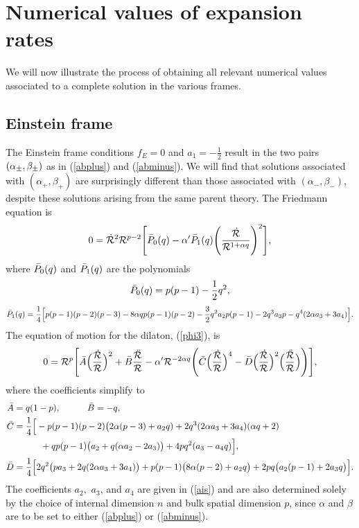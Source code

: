 \documentclass[amsmath,amssymb,11pt]{article}
\begin{document}



\section{Numerical values of expansion rates}\label{AppendixForRates}

We will now illustrate the process of obtaining all relevant numerical values associated to a complete solution in the various frames. 


\subsection{Einstein frame}
The Einstein frame conditions $f_{E}=0$ and $a_{1}=-\frac{1}{2}$ result in the two pairs $(\alpha_{\pm},\beta_{\pm})$ as in (\ref{abplus}) and (\ref{abminus}). We will find that solutions associated with $(\alpha_+,\beta_+)$ are surprisingly different than those associated with $(\alpha_-,\beta_-)$, despite these solutions arising from the same parent theory.  The Friedmann equation is 
\begin{equation}\label{Fried2}
0=\dot{\mathcal{R}}^2\mathcal{R}^{p-2}\Bigg[\bar{P}_0(q)-\alpha'\bar{P}_1(q)\Bigg( \frac{\dot{\mathcal{R}}}{\mathcal{R}^{1+\alpha q}}\Bigg)^2\Bigg],
\end{equation}
where $\bar{P}_0(q)$ and $\bar{P}_1(q)$ are the polynomials
\begin{equation}\label{P0}
\bar{P}_0(q) = p(p-1)-\frac{1}{2}q^2,
\end{equation}
\begin{equation}\label{P1}
\bar{P}_1(q) =\frac{1}{4}\Big[ p(p-1)(p-2)(p-3)-8\alpha qp(p-1)(p-2)-\frac{3}{2}q^2a_2 p(p-1)-2q^3 a_3p-q^4(2\alpha a_3+3a_4)\Big].
\end{equation}
The equation of motion for the dilaton, (\ref{phi3}), is
\begin{equation}\label{phi4}
\begin{split}
0=\mathcal{R}^p\Bigg[\bar{A}\Big(\frac{\dot{\mathcal{R}}}{\mathcal{R}}\Big)^2+\bar{B}\frac{\ddot{\mathcal{R}}}{\mathcal{R}}-\alpha'\mathcal{R}^{-2\alpha q}\Bigg(\bar{C}\Big(\frac{\dot{\mathcal{R}}}{\mathcal{R}}\Big)^4-\bar{D}\Big(\frac{\dot{\mathcal{R}}}{\mathcal{R}}\Big)^2\Big(\frac{\ddot{\mathcal{R}}}{\mathcal{R}}\Big)\Bigg)\Bigg],
\end{split}
\end{equation}
where the coefficients simplify to
\begin{equation}
\begin{split}
\bar{A}&=q(1-p), \ \ \ \ \ \ \ \ \ \bar{B}=-q, \\
\bar{C}&=\frac{1}{4}\Big[-p(p-1)(p-2)\big(2\alpha(p-3)+a_2q)+2q^3(2\alpha a_3+3a_4)(\alpha q+2) \\
& \ \ \ \ \ \ \ \ \ +qp(p-1)\big(a_2+q(\alpha a_2-2a_3)\big)+4pq^2(a_3-a_4 q)\Big], \\
\bar{D}&=\frac{1}{4}\Big[2q^2\big(pa_3+2q(2\alpha a_3+3a_4)\big)+p(p-1)\big(8\alpha(p-2)+a_2 q\big)+2pq\big(a_2(p-1)+2a_3 q\big) \Big].
\end{split}
\end{equation}
The coefficients $a_2,$ $a_3$, and $a_4$ are given in (\ref{ais}) and are also determined solely by the choice of internal dimension $n$ and bulk spatial dimension $p$, since $\alpha$ and $\beta$ are to be set to either (\ref{abplus}) or (\ref{abminus}). 
\end{document}
